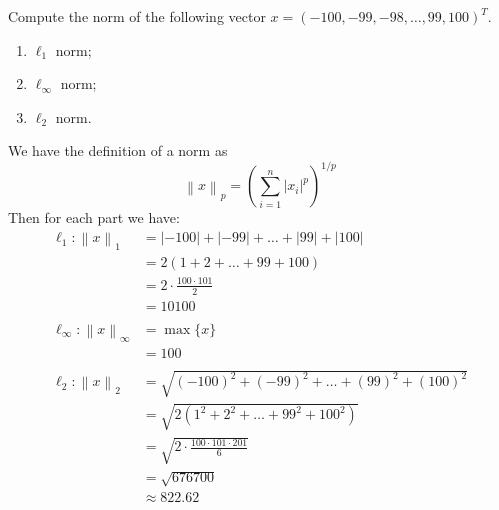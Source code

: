 \documentclass[11pt]{article}
\renewcommand{\norm}[1]{\left\lVert#1\right\rVert}
\begin{document}
\makeAssignmentTitle

\begin{homeworkProblem}

Compute the norm of the following vector $x = (-100, -99, -98, \ldots, 99, 100)^T$.

\begin{enumerate}[label=(\alph*), topsep=5pt]
    \item $\ell_1$ norm;
    \item $\ell_\infty$ norm;
    \item $\ell_2$ norm.
\end{enumerate} \vspace{1\baselineskip}

\solution

We have the definition of a norm as 
\[
    \norm{x}_p = \left( \sum_{i=1}^{n} |x_i|^p \right)^{\!\!1/p}
\]
Then for each part we have:
\begin{align*}
    \ell_1: \norm{x}_1 &= |-100| + |-99| + \ldots + |99| + |100| \\
    &= 2(1 + 2 + \ldots + 99 + 100) \\
    &= 2 \cdot \frac{100 \cdot 101}{2} \\
    &= 10100 \\\\
    \ell_\infty: \norm{x}_\infty &=  \max\{x\} \\
    &= 100 \\\\
    \ell_2: \norm{x}_2 &= \sqrt{(-100)^2 + (-99)^2 + \ldots + (99)^2 + (100)^2} \\
    &= \sqrt{2(1^2 + 2^2 + \ldots + 99^2 + 100^2)} \\
    &= \sqrt{2 \cdot \frac{100 \cdot 101 \cdot 201}{6}} \\
    &= \sqrt{676700} \\
    &\approx 822.62
\end{align*}

\end{homeworkProblem}

\pagebreak
\end{document}
